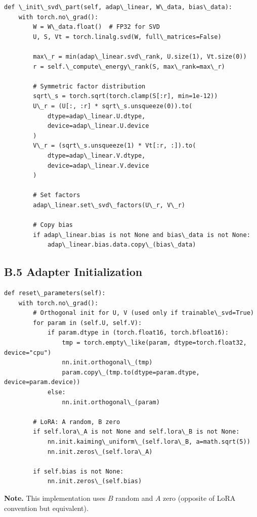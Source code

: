 \begin{lstlisting}
def \_init\_svd\_part(self, adap\_linear, W\_data, bias\_data):
    with torch.no\_grad():
        W = W\_data.float()  # FP32 for SVD
        U, S, Vt = torch.linalg.svd(W, full\_matrices=False)
        
        max\_r = min(adap\_linear.svd\_rank, U.size(1), Vt.size(0))
        r = self.\_compute\_energy\_rank(S, max\_rank=max\_r)
        
        # Symmetric factor distribution
        sqrt\_s = torch.sqrt(torch.clamp(S[:r], min=1e-12))
        U\_r = (U[:, :r] * sqrt\_s.unsqueeze(0)).to(
            dtype=adap\_linear.U.dtype,
            device=adap\_linear.U.device
        )
        V\_r = (sqrt\_s.unsqueeze(1) * Vt[:r, :]).to(
            dtype=adap\_linear.V.dtype,
            device=adap\_linear.V.device
        )
        
        # Set factors
        adap\_linear.set\_svd\_factors(U\_r, V\_r)
        
        # Copy bias
        if adap\_linear.bias is not None and bias\_data is not None:
            adap\_linear.bias.data.copy\_(bias\_data)
\end{lstlisting}

\subsection{B.5 Adapter Initialization}

\begin{lstlisting}
def reset\_parameters(self):
    with torch.no\_grad():
        # Orthogonal init for U, V (used only if trainable\_svd=True)
        for param in (self.U, self.V):
            if param.dtype in (torch.float16, torch.bfloat16):
                tmp = torch.empty\_like(param, dtype=torch.float32, device="cpu")
                nn.init.orthogonal\_(tmp)
                param.copy\_(tmp.to(dtype=param.dtype, device=param.device))
            else:
                nn.init.orthogonal\_(param)
        
        # LoRA: A random, B zero
        if self.lora\_A is not None and self.lora\_B is not None:
            nn.init.kaiming\_uniform\_(self.lora\_B, a=math.sqrt(5))
            nn.init.zeros\_(self.lora\_A)
        
        if self.bias is not None:
            nn.init.zeros\_(self.bias)
\end{lstlisting}

\textbf{Note.} This implementation uses $B$ random and $A$ zero (opposite of LoRA 
convention but equivalent).

